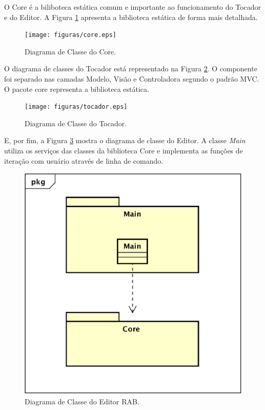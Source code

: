 O Core é a biliboteca estática comum e importante ao funcionamento do Tocador e do Editor. A Figura \ref{core} apresenta a biblioteca estática de forma mais detalhada. 

 \begin{figure}[ht]
	\centering
		\texttt{[image: figuras/core.eps]}
	\caption{Diagrama de Classe do Core.}
	\label{core}
\end{figure}

O diagrama de classes do Tocador está representado na Figura \ref{tocador}. O componente foi separado nas camadas Modelo, Visão e Controladora segundo o padrão MVC. O pacote core representa a biblioteca estática.

\begin{figure}[ht]
	\centering
		\texttt{[image: figuras/tocador.eps]}
	\caption{Diagrama de Classe do Tocador.}
	\label{tocador}
\end{figure}

E, por fim, a Figura \ref{editor} mostra o diagrama de classe do Editor. A classe \textit{Main} utiliza os serviços das classes da biblioteca Core e implementa as funções de iteração com usuário através de linha de comando.

\begin{figure}[ht]
	\centering
		\includegraphics[keepaspectratio=true,scale=0.5]{figuras/editor.eps}
	\caption{Diagrama de Classe do Editor RAB.}
	\label{editor}
\end{figure}

